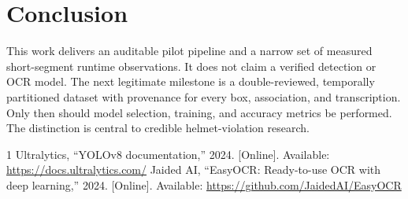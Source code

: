 \documentclass[journal]{IEEEtran}
\begin{document}
\section{Conclusion}
This work delivers an auditable pilot pipeline and a narrow set of measured short-segment runtime observations. It does not claim a verified detection or OCR model. The next legitimate milestone is a double-reviewed, temporally partitioned dataset with provenance for every box, association, and transcription. Only then should model selection, training, and accuracy metrics be performed. The distinction is central to credible helmet-violation research.
\begin{thebibliography}{1}
Ultralytics, ``YOLOv8 documentation,'' 2024. [Online]. Available: \url{https://docs.ultralytics.com/}
Jaided AI, ``EasyOCR: Ready-to-use OCR with deep learning,'' 2024. [Online]. Available: \url{https://github.com/JaidedAI/EasyOCR}
\end{thebibliography}
\end{document}
